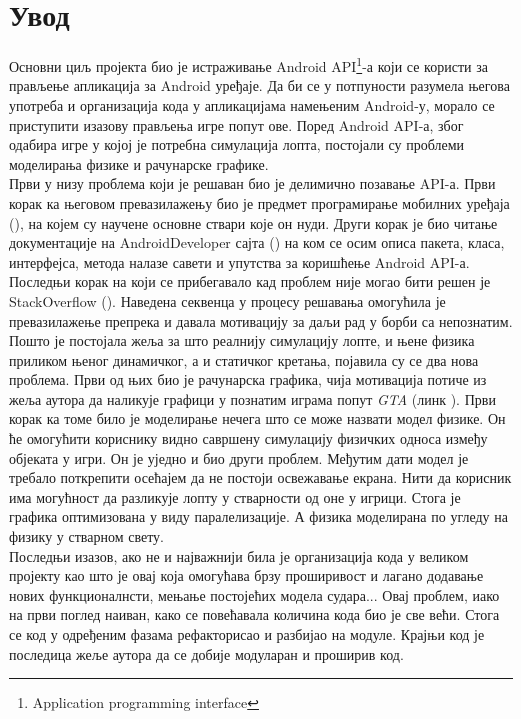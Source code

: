 
\chapter{Увод}
Основни циљ пројекта био је истраживање Android API\footnote{Application programming interface}-а који се користи за прављење апликација за Android уређаје. Да би се у потпуности разумела његова употреба и организација кода у апликацијама намењеним Android-у, морало се приступити изазову прављења игре попут ове. Поред Android API-а, због одабира игре у којој је потребна симулација лопта, постојали су проблеми моделирања физике и рачунарске графике.
\\ \indent Први у низу проблема који је решаван био је делимично позавање API-а. Први корак ка његовом превазилажењу био је предмет програмирање мобилних уређаја (\cite{PMU}), на којем су научене основне ствари које он нуди. Други корак је био читање документације на AndroidDeveloper сајта (\cite{AndroidDeveloper}) на ком се осим описа пакета, класа, интерфејса, метода налазе савети и упутства за коришћење Android API-а. Последњи корак на који се прибегавало кад проблем није могао бити решен је StackOverflow (\cite{StackOverflow}). Наведена секвенца у процесу решавања омогућила је превазилажење препрека и давала мотивацију за даљи рад у борби са непознатим.
\\ \indent Пошто је постојала жеља за што реалнију симулацију лопте, и њене физика приликом њеног динамичког, а и статичког кретања, појавила су се два нова проблема. Први од њих био је рачунарска графика, чија мотивација  потиче из жеља аутора да наликује графици у познатим играма попут \emph{GTA} (линк \cite{GTA}). Први корак ка томе било је моделирање нечега што се може назвати модел физике. Он ће омогућити кориснику видно савршену симулацију физичких односа између објеката у игри. Он је уједно и био други проблем. Међутим дати модел је требало поткрепити осећајем да не постоји освежавање екрана. Нити да корисник има могућност да разликује лопту у стварности од оне у игрици. Стога је графика оптимизована у виду паралелизације. А физика моделирана по угледу на физику у стварном свету.
\\ \indent Последњи изазов, ако не и најважнији била је организација кода у великом пројекту као што је овај која омогућава брзу проширивост и лагано додавање нових функционалнсти, мењање постојећих модела судара... Овај проблем, иако на први поглед наиван, како се повећавала количина кода био је све већи. Стога се код у одређеним фазама рефакторисао и разбијао на модуле. Крајњи код је последица жеље аутора да се добије модуларан и проширив код.
